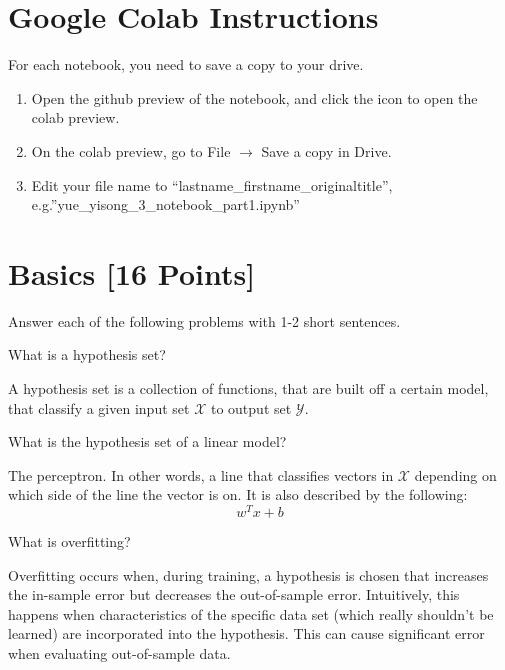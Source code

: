\section*{Google Colab Instructions}

For each notebook, you need to save a copy to your drive.

\begin{enumerate}
	\item Open the github preview of the notebook, and click the icon to open the colab preview.
	\item On the colab preview, go to File $\rightarrow$ Save a copy in Drive.
	\item Edit your file name to “lastname_firstname_originaltitle”, e.g.”yue_yisong_3_notebook_part1.ipynb”
\end{enumerate}


\newpage
\section{Basics [16 Points]}

Answer each of the following problems with 1-2 short sentences.

\begin{problem}[2]
  What is a hypothesis set?
\end{problem}
\begin{solution}
A hypothesis set is a collection of functions, that are built off a certain model, that classify a given input set $\mathcal{X}$ to output set $\mathcal{Y}$.
\end{solution}

\begin{problem}[2]
  What is the hypothesis set of a linear model?
\end{problem}
\begin{solution}
  The perceptron. In other words, a line that classifies vectors in $\mathcal{X}$ depending on which side of the line the vector is on. It is also described by the following:
  $$
  w^Tx+b
  $$
\end{solution}

\begin{problem}[2]
  What is overfitting?
\end{problem}
\begin{solution}
  Overfitting occurs when, during training, a hypothesis is chosen that increases the in-sample error but decreases the out-of-sample error. Intuitively, this happens when characteristics of the specific data set (which really shouldn't be learned) are incorporated into the hypothesis. This can cause significant error when evaluating out-of-sample data.
\end{solution}

